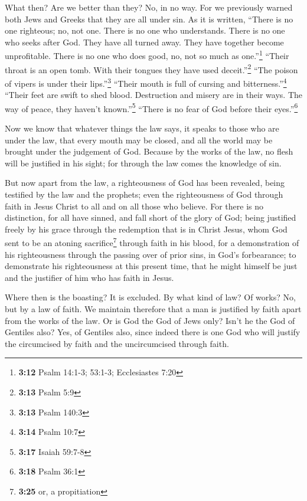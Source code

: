  What then? Are we better than they? No, in no way. For we
previously warned both Jews and Greeks that they are all under sin.
 As it is written, ``There is no one righteous; no, not
one.  There is no one who understands. There is no one
who seeks after God.  They have all turned away. They
have together become unprofitable. There is no one who does good, no,
not so much as one.''\footnote{\textbf{3:12} Psalm 14:1-3; 53:1-3;
  Ecclesiastes 7:20}  ``Their throat is an open tomb.
With their tongues they have used deceit.''\footnote{\textbf{3:13} Psalm
  5:9} ``The poison of vipers is under their lips.''\footnote{\textbf{3:13}
  Psalm 140:3}  ``Their mouth is full of cursing and
bitterness.''\footnote{\textbf{3:14} Psalm 10:7}  ``Their
feet are swift to shed blood.  Destruction and misery are
in their ways.  The way of peace, they haven't
known.''\footnote{\textbf{3:17} Isaiah 59:7-8}  ``There
is no fear of God before their eyes.''\footnote{\textbf{3:18} Psalm 36:1}

 Now we know that whatever things the law says, it speaks
to those who are under the law, that every mouth may be closed, and all
the world may be brought under the judgement of God. 
Because by the works of the law, no flesh will be justified in his
sight; for through the law comes the knowledge of sin.

 But now apart from the law, a righteousness of God has
been revealed, being testified by the law and the prophets;
 even the righteousness of God through faith in Jesus
Christ to all and on all those who believe. For there is no distinction,
 for all have sinned, and fall short of the glory of God;
 being justified freely by his grace through the
redemption that is in Christ Jesus,  whom God sent to be
an atoning sacrifice\footnote{\textbf{3:25} or, a propitiation} through
faith in his blood, for a demonstration of his righteousness through the
passing over of prior sins, in God's forbearance;  to
demonstrate his righteousness at this present time, that he might
himself be just and the justifier of him who has faith in Jesus.

 Where then is the boasting? It is excluded. By what kind
of law? Of works? No, but by a law of faith.  We maintain
therefore that a man is justified by faith apart from the works of the
law.  Or is God the God of Jews only? Isn't he the God of
Gentiles also? Yes, of Gentiles also,  since indeed there
is one God who will justify the circumcised by faith and the
uncircumcised through faith.

